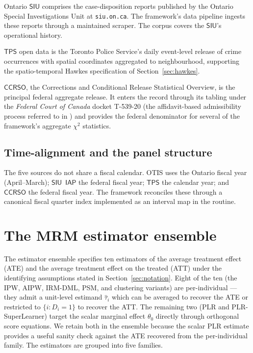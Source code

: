 \documentclass[article,shortnames,nojss]{jss}
\newcommand{\OTIS}{\textsf{OTIS}}
\newcommand{\SIU}{\textsf{SIU}}
\newcommand{\TPS}{\textsf{TPS}}
\newcommand{\CCRSO}{\textsf{CCRSO}}
\newcommand{\IAP}{\textsf{IAP}}
\begin{document}
Ontario $\SIU$ comprises the case-disposition reports published by
the Ontario Special Investigations Unit at \texttt{siu.on.ca}. The
framework's data pipeline ingests these reports through a
maintained scraper.  The corpus covers the $\SIU$'s operational
history.

$\TPS$ open data is the Toronto Police Service's daily event-level
release of crime occurrences with spatial coordinates aggregated to
neighbourhood, supporting the spatio-temporal Hawkes specification
of Section~\ref{sec:hawkes}.

$\CCRSO$, the Corrections and Conditional Release Statistical
Overview, is the principal federal aggregate release. It enters the
record through its tabling under the \emph{Federal Court of Canada}
docket T-539-20 (the affidavit-based admissibility process referred
to in \citealt{Doob2023}) and provides the federal denominator for
several of the framework's aggregate $\chi^{2}$ statistics.

\subsection{Time-alignment and the panel structure}

The five sources do not share a fiscal calendar.
\OTIS{} uses the Ontario fiscal year (April--March); $\SIU$~$\IAP$
the federal fiscal year; $\TPS$ the calendar year; and $\CCRSO$ the
federal fiscal year. The framework reconciles these through a
canonical fiscal quarter index implemented as an interval map in
the  routine.

\section{The MRM estimator ensemble}
\label{sec:per-individual}

The estimator ensemble specifies ten estimators of the average
treatment effect (ATE) and the average treatment effect on the
treated (ATT) under the identifying assumptions stated in
Section~\ref{sec:notation}.  Eight of the ten (the IPW, AIPW,
IRM-DML, PSM, and clustering variants) are per-individual --- they
admit a unit-level estimand $\hat{\tau}_i$ which can be averaged
to recover the ATE or restricted to $\{i: D_i=1\}$ to recover the
ATT.  The remaining two (PLR and PLR-SuperLearner) target the
scalar marginal effect $\theta_0$ directly through orthogonal
score equations.  We retain both in the ensemble because the
scalar PLR estimate provides a useful sanity check against the
ATE recovered from the per-individual family.  The estimators
are grouped into five families.
\end{document}
